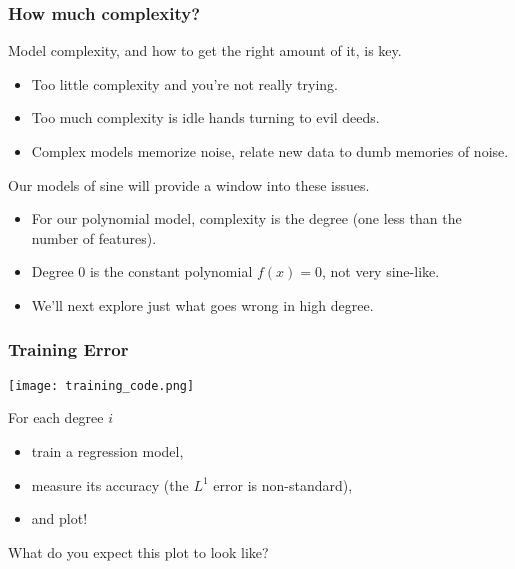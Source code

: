 \documentclass[presentation]{beamer}
\begin{document}
\begin{frame}
\frametitle{How much complexity?}

Model complexity, and how to get the right amount of it, is key.
\begin{itemize}

\item Too little complexity and you're not really trying.
\item Too much complexity is idle hands turning to evil deeds.
\item Complex models memorize noise, relate new data to dumb memories of noise.

\end{itemize}

Our models of sine will provide a window into these issues.
\begin{itemize}

\item For our polynomial model, complexity is the degree (one less than the number of features).
\item Degree 0 is the constant polynomial $f(x)=0$, not very sine-like.
\item We'll next explore just what goes wrong in high degree.

\end{itemize}

\end{frame}


\begin{frame}
\frametitle{Training Error}

\texttt{[image: training\_code.png]}

\vspace{5mm}

For each degree $i$
\begin{itemize}

\item train a regression model,
\item measure its accuracy (the $L^1$ error is non-standard),
\item and plot!

\end{itemize}

What do you expect this plot to look like?

\end{frame}
\end{document}
